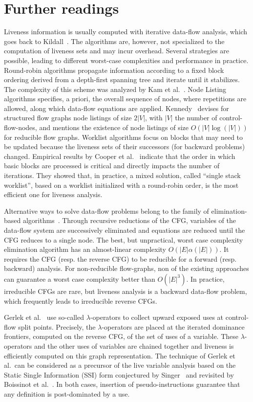 \section{Further readings}
\label{sec:liveness:further}
Liveness information is usually computed with iterative
data-flow analysis, which goes back to Kildall~\cite{Kildall}. The algorithms are,
however, not specialized to the computation of liveness sets and may
incur overhead. Several strategies are possible, leading to
different worst-case complexities and performance in practice. Round-robin algorithms
propagate information according to a fixed block ordering derived from a
depth-first spanning tree and iterate until it stabilizes.  The complexity of
this scheme was analyzed by Kam et al.~\cite{novillo:bib:KU76}.  
Node Listing algorithms specifies, a priori, the overall sequence of nodes, where repetitions are allowed, along which data-flow equations are applied. Kennedy~\cite{Kennedy75} devises for structured flow graphs node listings of size $2|V|$, with $|V|$ the number of control-flow-nodes, and mentions the existence of node listings of size $O\left(|V| \log(|V|)\right)$ for reducible flow graphs.
Worklist algorithms focus on blocks that may need
to be updated because the liveness sets of their successors (for
backward problems) changed.
Empirical results by Cooper et al.~\cite{CHK06} indicate that the order in
which basic blocks are processed is critical and directly impacts the number of
iterations. They showed that, in practice, a mixed solution, called ``single
stack worklist'', based on a worklist initialized with a round-robin order, is
the most efficient one  for liveness analysis. 

Alternative ways to solve data-flow problems belong to the family of elimina\-tion-based algorithms~\cite{RyPa86b}. Through recursive reductions of the 
CFG, variables of the data-flow system are successively eliminated and equations are reduced until the CFG reduces to a single node. 
The best, but unpractical, worst case complexity elimination algorithm has an almost-linear complexity $O(|E|\alpha(|E|))$. 
It requires the CFG (resp. the reverse CFG) to be reducible for a forward (resp.  backward) analysis.
For non-reducible flow-graphs, non of the existing approa\-ches can guarantee a worst case complexity better than $O(|E|^3)$.
In practice, irreducible CFGs are rare, but liveness
analysis is a backward data-flow problem, which frequently leads to
irreducible reverse CFGs. 

Gerlek et al.~\cite{gerlek94reference} use so-called $\lambda$-operators to collect upward exposed uses at control-flow split points.
Precisely, the $\lambda$-operators are placed at the iterated dominance frontiers, computed on the reverse CFG, of the set of uses of a variable.
These $\lambda$-operators and the other uses of variables are chained together and liveness is efficiently computed on this graph representation.
The technique of Gerlek et al.~can be considered as a precursor of the live variable analysis based on the Static Single Information (SSI) form conjectured by Singer~\cite{novillo:bib:S05} and revisited by Boissinot et al.~\cite{BoissinotBDR12}.
In both cases, insertion of pseudo-instructions guarantee that any definition is post-dominated by a use.

